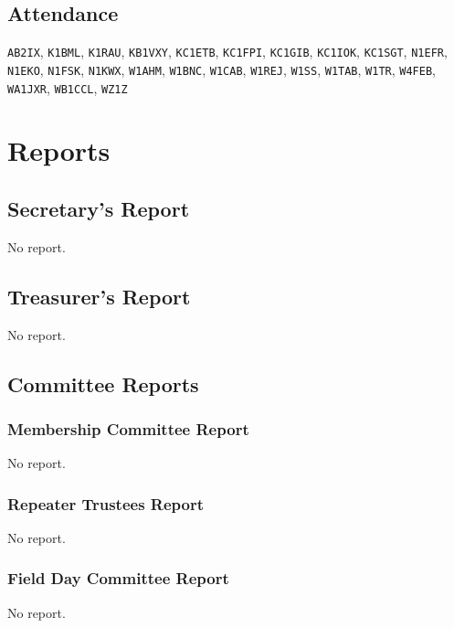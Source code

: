 \documentclass[10pt,letterpaper]{article}
\begin{document}
\subsection{Attendance}

\texttt{AB2IX},
\texttt{K1BML},
\texttt{K1RAU},
\texttt{KB1VXY},
\texttt{KC1ETB},
\texttt{KC1FPI},
\texttt{KC1GIB},
\texttt{KC1IOK},
\texttt{KC1SGT},
\texttt{N1EFR},
\texttt{N1EKO},
\texttt{N1FSK},
\texttt{N1KWX},
\texttt{W1AHM},
\texttt{W1BNC},
\texttt{W1CAB},
\texttt{W1REJ},
\texttt{W1SS},
\texttt{W1TAB},
\texttt{W1TR},
\texttt{W4FEB},
\texttt{WA1JXR},
\texttt{WB1CCL},
\texttt{WZ1Z}



\section{Reports}

\subsection{Secretary's Report}
No report.

\newpage
\subsection{Treasurer's Report}
No report.

\subsection{Committee Reports}

\subsubsection{Membership Committee Report}
No report.

\subsubsection{Repeater Trustees Report}
No report.

\subsubsection{Field Day Committee Report}
No report.
\end{document}
